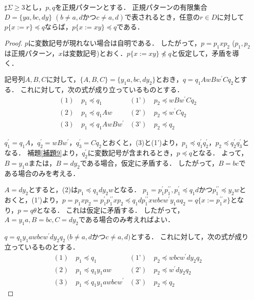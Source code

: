 \begin{lem}\label{追加部分}
$\sharp \Sigma \ge 3$とし，$p, q$を正規パターンとする．
正規パターンの有限集合$D= \{ ya, bc, dy \}$ $(b \not = a,dかつc \not = a,d)$で表されるとき，任意の$r \in D$に対して$p \{ x := r \} \preceq q$ならば，$p \{ x := xy \} \preceq q$である．
\end{lem}
\begin{proof}
$p$に変数記号が現れない場合は自明である．
したがって，$p=p_{1}xp_{2}$ ($p_{1}, p_{2}$は正規パターン，$x$は変数記号)とおく．$p \{ x := xy \} \not \preceq q$と仮定して，矛盾を導く．

記号列$A,B,C$に対して，$\{ A,B,C \} = \{ y_{1}a,bc,dy_{2} \}$とおき，$q=q_{1}AwBw^{\prime}Cq_{2}$とする．
これに対して，次の式が成り立っているものとする．
\begin{align*}
(1)~& p_{1} \preceq q_{1} & (\text{1'})~& p_{2} \preceq wBw^{\prime}Cq_{2} \\
(2)~& p_{1} \preceq q_{1}Aw & (\text{2'})~& p_{2} \preceq w^{\prime}Cq_{2} \\
(3)~& p_{1} \preceq q_{1}AwBw^{\prime} & (\text{3'})~& p_{2} \preceq q_{2}
\end{align*}

$q^{\prime}_{1}=q_{1}A，q^{\prime}_{2}=wBw^{\prime}，q^{\prime}_{3}=Cq_{2}$とおくと，(3)と(1')より，$p_{1} \preceq q^{\prime}_{1}q^{\prime}_{2}，p_{2} \preceq q^{\prime}_{2}q^{\prime}_{3}$となる．
補題\ref{補題9}より，$q^{\prime}_{2}$に変数記号が含まれるとき，$p \preceq q$となる．
よって，$B=y_{1}a$または，$B=dy_{2}$である場合，仮定に矛盾する．
したがって，$B=bc$である場合のみを考える．

$A=dy_{2}$とすると，(2)は$p_{1} \preceq q_{1}dy_{2}w$となる．
$p_{1}=p^{\prime}_{1}p^{\prime\prime}_{1}, p^{\prime}_{1} \preceq q_{1}d$かつ$p^{\prime\prime}_{1} \preceq y_{2}w$とおくと，(1')より，$p=p_{1}xp_{2}=p^{\prime}_{1}p^{\prime\prime}_{1}xp_{2} \preceq q_{1}dp^{\prime\prime}_{1}xwbcw^{\prime}y_{1}aq_{2}=q \{ x:=p^{\prime\prime}_{1}x \}$となり，$p=q\theta$となる．
これは仮定に矛盾する．
したがって，$A=y_{1}a,B=bc,C=dy_{2}$である場合のみ考えればよい．

$q=q_{1}y_{1}awbcw^{\prime}dy_{2}q_{2}~(b \not = a,d$かつ$c \not = a,d)$とする．
これに対して，次の式が成り立っているものとする．
\begin{align*}
(1)~& p_{1} \preceq q_{1} & (\text{1'})~& p_{2} \preceq wbcw^{\prime}dy_{2}q_{2} \\
(2)~& p_{1} \preceq q_{1}y_{1}aw & (\text{2'})~& p_{2} \preceq w^{\prime}dy_{2}q_{2} \\
(3)~& p_{1} \preceq q_{1}y_{1}awbcw^{\prime} & (\text{3'})~& p_{2} \preceq q_{2}
\end{align*}


\end{proof}
